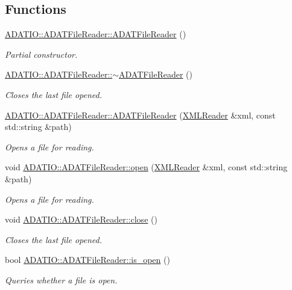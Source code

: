 \subsection*{Functions}
\begin{DoxyCompactItemize}
\item 
\mbox{\hyperlink{group__qio_ga800c009d1400eb965cc04a7f90bf4f24}{A\+D\+A\+T\+I\+O\+::\+A\+D\+A\+T\+File\+Reader\+::\+A\+D\+A\+T\+File\+Reader}} ()
\begin{DoxyCompactList}\small\item\em Partial constructor. \end{DoxyCompactList}\item 
\mbox{\hyperlink{group__qio_ga54a5eea68d2a1c6f5b748f6ba75b7d22}{A\+D\+A\+T\+I\+O\+::\+A\+D\+A\+T\+File\+Reader\+::$\sim$\+A\+D\+A\+T\+File\+Reader}} ()
\begin{DoxyCompactList}\small\item\em Closes the last file opened. \end{DoxyCompactList}\item 
\mbox{\hyperlink{group__qio_ga096a7060d69fd109067404e75f8a06ee}{A\+D\+A\+T\+I\+O\+::\+A\+D\+A\+T\+File\+Reader\+::\+A\+D\+A\+T\+File\+Reader}} (\mbox{\hyperlink{classADATXML_1_1XMLReader}{X\+M\+L\+Reader}} \&xml, const std\+::string \&path)
\begin{DoxyCompactList}\small\item\em Opens a file for reading. \end{DoxyCompactList}\item 
void \mbox{\hyperlink{group__qio_ga2b2ac967129dfd2d61a79e36034b400f}{A\+D\+A\+T\+I\+O\+::\+A\+D\+A\+T\+File\+Reader\+::open}} (\mbox{\hyperlink{classADATXML_1_1XMLReader}{X\+M\+L\+Reader}} \&xml, const std\+::string \&path)
\begin{DoxyCompactList}\small\item\em Opens a file for reading. \end{DoxyCompactList}\item 
void \mbox{\hyperlink{group__qio_ga8b86dba1600272d26539815146f04078}{A\+D\+A\+T\+I\+O\+::\+A\+D\+A\+T\+File\+Reader\+::close}} ()
\begin{DoxyCompactList}\small\item\em Closes the last file opened. \end{DoxyCompactList}\item 
bool \mbox{\hyperlink{group__qio_ga601972c66a6e6671d7b41ee1bce80e82}{A\+D\+A\+T\+I\+O\+::\+A\+D\+A\+T\+File\+Reader\+::is\+\_\+open}} ()
\begin{DoxyCompactList}\small\item\em Queries whether a file is open. \end{DoxyCompactList}\item 

\end{DoxyCompactItemize}
